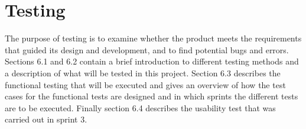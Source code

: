 \chapter{Testing}

	The purpose of testing is to examine whether the product meets the requirements that guided its design 
	and development, and to find potential bugs and errors. Sections 6.1 and 6.2 contain a brief introduction 
	to different testing methods and a description of what will be tested in this project. Section 6.3 describes 
	the functional testing that will be executed and gives an overview of how the test cases for the functional 
	tests are designed and in which sprints the different tests are to be executed. Finally section 6.4 describes 
	the usability test that was carried out in sprint 3.